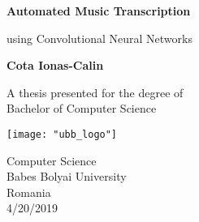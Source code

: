 \begin{titlepage}
   \begin{center}
       \vspace*{1cm}
       
       \Huge
       \textbf{Automated Music Transcription}
 
       \vspace{0.5cm}
       \LARGE
       using Convolutional Neural Networks
 
       \vspace{1.5cm}
 
       \textbf{Cota Ionas-Calin}
 
       \vfill
 
       A thesis presented for the degree of\\
       Bachelor of Computer Science
 
       \vspace{0.8cm}
 
       \texttt{[image: "ubb\_logo"]}
      
       \Large
       Computer Science\\
       Babes Bolyai University\\
       Romania\\
       4/20/2019
 
   \end{center}
\end{titlepage}